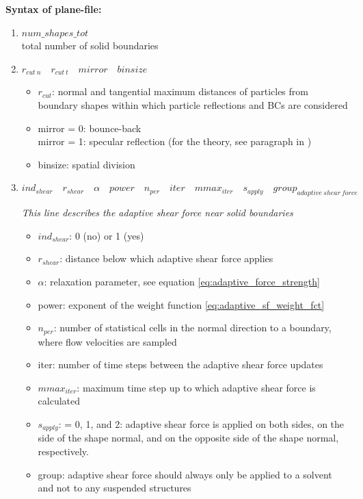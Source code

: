 \textbf{Syntax of plane-file:}
\begin{enumerate}
\item $num\_shapes\_tot$\\
total number of solid boundaries

\item $  r_{cut\ n} \quad   r_{cut\ t} \quad   mirror \quad   binsize$

	\begin{itemize}
	\item $ r_{cut}$: normal and tangential maximum distances of particles from boundary shapes within which particle reflections and BCs are considered
	\item mirror = 0: bounce-back\\ mirror = 1: specular reflection (for the theory, see paragraph in )
	\item binsize: spatial division
	\end{itemize}

\item $ind_{shear} \quad   r_{shear} \quad   \alpha \quad   power \quad   n_{per} \quad   iter \quad   mmax_{iter} \quad   s_{apply} \quad   group_{adaptive\ shear\ force}$

	{\em This line describes the adaptive shear force near solid boundaries}
	\begin{itemize}
	\item $ ind_{shear}$: 0 (no) or 1 (yes)
	\item $ r_{shear}$: distance below which adaptive shear force applies
	\item $\alpha$: relaxation parameter, see equation \eqref{eq:adaptive_force_strength}
	\item power: exponent of the weight function \eqref{eq:adaptive_sf_weight_fct}
	\item $ n_{per}$: number of statistical cells in the normal direction to a boundary, where flow velocities are sampled
	\item iter: number of time steps between the adaptive shear force updates
	\item $ mmax_{iter}$: maximum time step up to which adaptive shear force is calculated
	\item $ s_{apply}$: = 0, 1, and 2: adaptive shear force is applied on both sides, on the side of the shape normal, and on the opposite side of the shape normal, respectively.
	\item group: adaptive shear force should always only be applied to a solvent and not to any suspended structures
	\end{itemize}


\end{enumerate}
